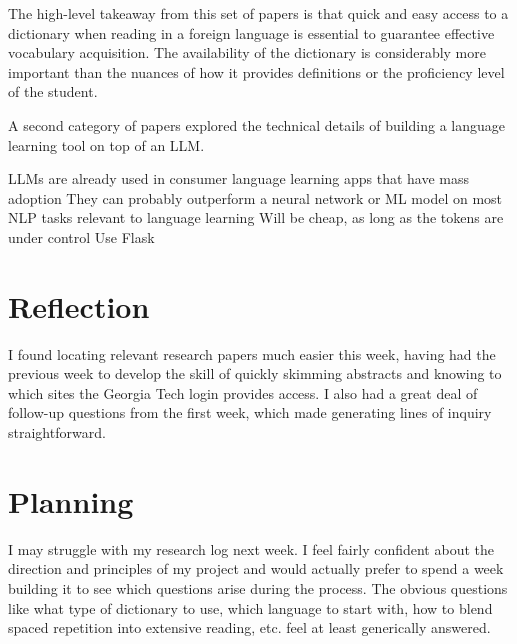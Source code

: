 \documentclass[
	letterpaper, %
]{jdf}
\begin{document}
The high-level takeaway from this set of papers is that quick and easy access to a dictionary when reading in a foreign language is essential to guarantee effective vocabulary acquisition. The availability of the dictionary is considerably more important than the nuances of how it provides definitions or the proficiency level of the student.

A second category of papers explored the technical details of building a language learning tool on top of an LLM. \cite{cepedasrs}

LLMs are already used in consumer language learning apps that have mass adoption \cite{caines2023application}
They can probably outperform a neural network or ML model on most NLP tasks relevant to language learning \cite{pilán2016readable}
Will be cheap, as long as the tokens are under control \cite{liu2023lost, mlq2023tokens}
Use Flask \cite{ghimire2019comparative}
\cite{mochiAPI}
\cite{merriamWebsterAPI}

\section{Reflection}
I found locating relevant research papers much easier this week, having had the previous week to develop the skill of quickly skimming abstracts and knowing to which sites the Georgia Tech login provides access. I also had a great deal of follow-up questions from the first week, which made generating lines of inquiry straightforward. 

\section{Planning}
I may struggle with my research log next week. I feel fairly confident about the direction and principles of my project and would actually prefer to spend a week building it to see which questions arise during the process. The obvious questions like what type of dictionary to use, which language to start with, how to blend spaced repetition into extensive reading, etc. feel at least generically answered. 
\end{document}

